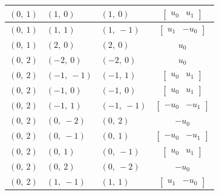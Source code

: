 \documentclass[11pt]{article}
\theoremstyle{definition}
\begin{document}
\begin{longtable}{|l|l|l|c|}
    \hline
    $\left( 0, \  1\right)$ & $\left( 1, \  0\right)$ & $\left( 1, \  0\right)$ & $\left[\begin{matrix}u_{0} & u_{1}\end{matrix}\right]$ \\
    \hline
    $\left( 0, \  1\right)$ & $\left( 1, \  1\right)$ & $\left( 1, \  -1\right)$ & $\left[\begin{matrix}u_{1} & - u_{0}\end{matrix}\right]$ \\
    \hline
    $\left( 0, \  1\right)$ & $\left( 2, \  0\right)$ & $\left( 2, \  0\right)$ & $u_{0}$ \\
    \hline
    $\left( 0, \  2\right)$ & $\left( -2, \  0\right)$ & $\left( -2, \  0\right)$ & $u_{0}$ \\
    \hline
    $\left( 0, \  2\right)$ & $\left( -1, \  -1\right)$ & $\left( -1, \  1\right)$ & $\left[\begin{matrix}u_{0} & u_{1}\end{matrix}\right]$ \\
    \hline
    $\left( 0, \  2\right)$ & $\left( -1, \  0\right)$ & $\left( -1, \  0\right)$ & $\left[\begin{matrix}u_{0} & u_{1}\end{matrix}\right]$ \\
    \hline
    $\left( 0, \  2\right)$ & $\left( -1, \  1\right)$ & $\left( -1, \  -1\right)$ & $\left[\begin{matrix}- u_{0} & - u_{1}\end{matrix}\right]$ \\
    \hline
    $\left( 0, \  2\right)$ & $\left( 0, \  -2\right)$ & $\left( 0, \  2\right)$ & $- u_{0}$ \\
    \hline
    $\left( 0, \  2\right)$ & $\left( 0, \  -1\right)$ & $\left( 0, \  1\right)$ & $\left[\begin{matrix}- u_{0} & - u_{1}\end{matrix}\right]$ \\
    \hline
    $\left( 0, \  2\right)$ & $\left( 0, \  1\right)$ & $\left( 0, \  -1\right)$ & $\left[\begin{matrix}u_{0} & u_{1}\end{matrix}\right]$ \\
    \hline
    $\left( 0, \  2\right)$ & $\left( 0, \  2\right)$ & $\left( 0, \  -2\right)$ & $- u_{0}$ \\
    \hline
    $\left( 0, \  2\right)$ & $\left( 1, \  -1\right)$ & $\left( 1, \  1\right)$ & $\left[\begin{matrix}u_{1} & - u_{0}\end{matrix}\right]$ \\

\end{longtable}
\end{document}
